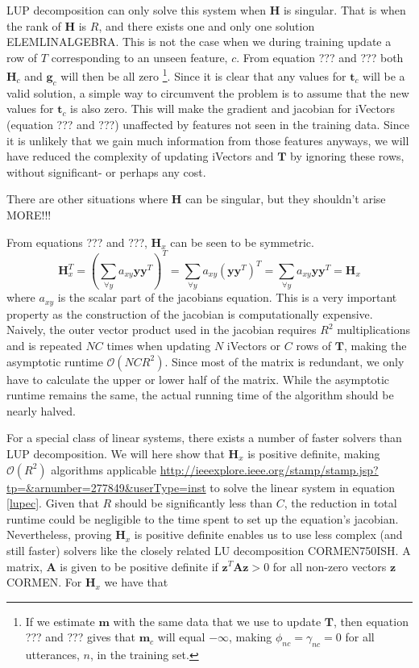 LUP decomposition can only solve this system when $\mathbf{H}$ is singular. That is when the rank of $\mathbf{H}$ is $R$, and there exists one and only one solution ELEMLINALGEBRA. This is not the case when we during training update a row of $T$ corresponding to an unseen feature, $c$. From equation ??? and ??? both $\mathbf{H}_c$ and $\mathbf{g}_c$ will then be all zero \footnote{If we estimate $\mathbf{m}$ with the same data that we use to update $\mathbf{T}$, then equation ??? and ??? gives that $\mathbf{m}_c$ will equal $-\infty$, making $\phi_{nc}=\gamma_{nc}=0$ for all utterances, $n$, in the training set.}. Since it is clear that any values for $\mathbf{t}_c$ will be a valid solution, a simple way to circumvent the problem is to assume that the new values for $\mathbf{t}_c$ is also zero. This will make the gradient and jacobian for iVectors (equation ??? and ???) unaffected by features not seen in the training data. Since it is unlikely that we gain much information  from those features anyways, we will have reduced the complexity of updating iVectors and $\mathbf{T}$ by ignoring these rows, without significant- or perhaps any cost.

There are other situations where $\mathbf{H}$ can be singular, but they shouldn't arise MORE!!!


From equations ??? and ???, $\mathbf{H}_x$ can be seen to be symmetric.
\begin{equation}\label{symproof}
\mathbf{H}_x^T = \left(\sum_{\forall y}a_{xy}\mathbf{y}\mathbf{y}^T\right)^T = 
\sum_{\forall y}a_{xy}\left(\mathbf{y}\mathbf{y}^T\right)^T =
 \sum_{\forall y}a_{xy}\mathbf{y}\mathbf{y}^T = \mathbf{H}_x
\end{equation}
where $a_{xy}$ is the scalar part of the jacobians equation. This is a very important property as the construction of the jacobian is computationally expensive. Naively, the outer vector product used in the jacobian requires $R^2$ multiplications and is repeated $NC$ times when updating $N$ iVectors or $C$ rows of $\mathbf{T}$, making the asymptotic runtime $\mathcal{O}(NCR^2)$.  Since most of the matrix is redundant, we only have to calculate the upper or lower half of the matrix. While the asymptotic runtime remains the same, the actual running time of the algorithm should be nearly halved.

For a special class of linear systems, there exists a number of faster solvers than LUP decomposition. We will here show that $\mathbf{H}_x$ is positive definite, making $\mathcal{O}(R^2)$ algorithms applicable \url{http://ieeexplore.ieee.org/stamp/stamp.jsp?tp=\&arnumber=277849\&userType=inst} to solve the linear system in equation \ref{lupec}. Given that $R$ should be significantly less than $C$, the reduction in total runtime could be negligible to the time spent to set up the equation's jacobian. Nevertheless, proving $\mathbf{H}_x$ is positive definite enables us to use less complex (and still faster) solvers like the closely related LU decomposition CORMEN750ISH. A matrix, $\mathbf{A}$ is given to be positive definite if $\mathbf{z}^T\mathbf{Az} > 0$ for all non-zero vectors $\mathbf{z}$ CORMEN. For $\mathbf{H}_x$ we have that

